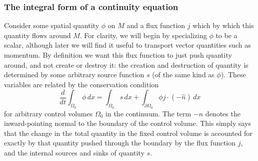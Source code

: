 \documentclass[11pt,a4paper]{memoir}
\newcommand{\pom}{{\partial\Omega}}
\newcommand{\pomn}{{\partial\Omega_0}}
\begin{document}
\subsubsection{The integral form of a continuity equation}
Consider some spatial quantity $\phi$ on $M$ and a flux function $j$ which by which
this quantity flows around $M$. For clarity, we will begin by specializing $\phi$ to be a scalar, although later we will find it useful to
transport vector quantities such as momentum. By definition we want this flux function to just push quantity around, and not create or destroy it:
the creation and destruction of quantity is determined by some arbitrary source function $s$ (of the same kind as $\phi$). These variables are related by the
conservation condition
\begin{equation}\label{continuity_equation}
    \frac{d}{dt} \int_{\Omega_0} \phi\,dx = \int_{\Omega_0} s\,dx + \int_{\pomn} \phi j \cdot \left(-\hat{n}\right)\,dx
\end{equation}
for arbitrary control volumes $\Omega_0$ in the continuum. The term $-\hat{n}$ denotes the inward-pointing normal to the boundary of the control volume. This simply says that the change in the total quantity in the fixed control volume is accounted for exactly by that quantity pushed through the boundary by the flux function $j$, and the internal sources and sinks of quantity $s$.
\end{document}
